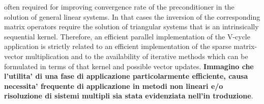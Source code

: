 often required for improving convergence rate of the preconditioner in
the solution of general linear systems. In that cases the inversion of
the corresponding matrix operators require the solution of triangular
systems that is an intrinsically sequential kernel. Therefore, an
efficient parallel implementation of the V-cycle application is
strictly related to an efficient implementation of the sparse
matrix-vector multiplication and to the availability of iterative
methods which can be formulated in terms of that kernel and possible
vector updates. 
\textbf{Immagino che l'utilita' di una fase di applicazione
  particolarmente efficiente, causa necessita' frequente di
  applicazione in metodi non lineari e/o risoluzione di sistemi
  multipli sia stata evidenziata nell'in troduzione}.